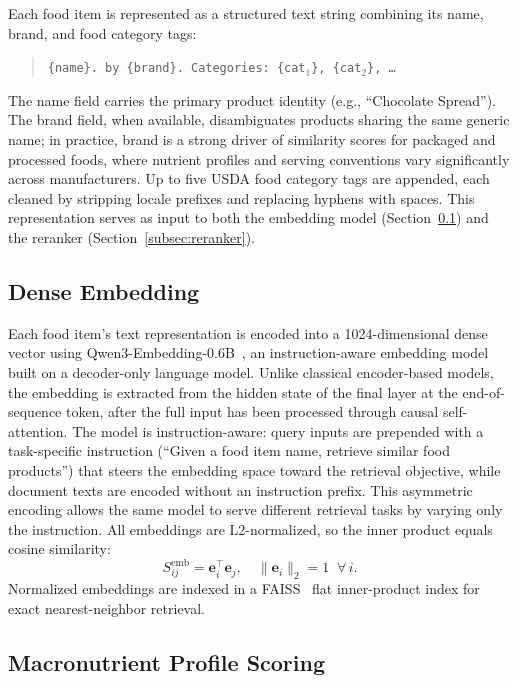 \documentclass[journal]{IEEEtran}
\begin{document}
Each food item is represented as a structured text string combining its
name, brand, and food category tags:
\begin{quote}
\texttt{\{name\}. by \{brand\}. Categories: \{cat$_1$\}, \{cat$_2$\}, \ldots}
\end{quote}
The name field carries the primary product identity (e.g., ``Chocolate
Spread''). The brand field, when available, disambiguates products
sharing the same generic name; in practice, brand is a strong driver
of similarity scores for packaged and processed foods, where nutrient
profiles and serving conventions vary significantly across manufacturers.
Up to five USDA food category tags are appended, each cleaned by
stripping locale prefixes and replacing hyphens with spaces. This representation serves as input to both the
embedding model (Section~\ref{subsec:embedding}) and the reranker
(Section~\ref{subsec:reranker}).

\subsection{Dense Embedding}
\label{subsec:embedding}

Each food item's text representation is encoded into a 1024-dimensional
dense vector using Qwen3-Embedding-0.6B~\cite{zhang2025qwen3embedding},
an instruction-aware embedding model built on a decoder-only language
model. Unlike classical encoder-based models, the embedding is extracted
from the hidden state of the final layer at the end-of-sequence token,
after the full input has been processed through causal self-attention.
The model is instruction-aware: query inputs are prepended with a
task-specific instruction (``Given a food item name, retrieve similar
food products'') that steers the embedding space toward the retrieval
objective, while document texts are encoded without an instruction
prefix. This asymmetric encoding allows the same model to serve
different retrieval tasks by varying only the instruction. All embeddings
are L2-normalized, so the inner product equals cosine similarity:
\begin{equation}
S_{ij}^{\mathrm{emb}} = \mathbf{e}_i^\top \mathbf{e}_j, \quad
\|\mathbf{e}_i\|_2 = 1 \;\;\forall\, i.
\label{eq:emb_sim}
\end{equation}
Normalized embeddings are indexed in a FAISS~\cite{johnson2019faiss}
flat inner-product index for exact nearest-neighbor retrieval.

\subsection{Macronutrient Profile Scoring}
\label{subsec:macro_scoring}
\end{document}
